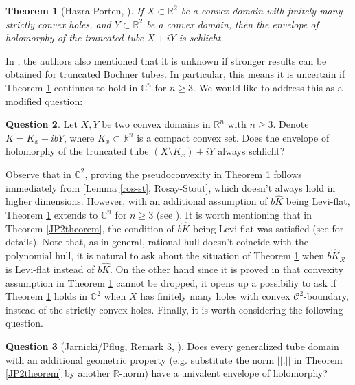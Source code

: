 \documentclass[12pt,reqno, a4paper]{amsart}
\newtheorem{theorem}{Theorem}[section]
\theoremstyle{definition}
\newtheorem{ques}[theorem]{Question}
\theoremstyle{definition}
\numberwithin{equation}{section}
\def\R{\mathbb{R}}                              %
\def\C{\mathbb{C}}                              %
\begin{document}
\begin{theorem}[Hazra-Porten, \cite{haz-por}]\label{haz-por_sch_2}
If $X\subset \R^2$ be a convex domain with finitely many strictly convex holes, and $Y \subset \R^2$ be a convex domain, then the envelope of holomorphy of the truncated tube $X+ iY$ is schlicht.
\end{theorem}

In \cite[Remark 4.2.(a)]{haz-por}, the authors also mentioned that it is unknown if stronger results can be obtained for truncated Bochner tubes. In particular, this means it is uncertain if Theorem \ref{haz-por_sch_2} continues to hold in $\C^n$ for $n\geq 3$. We would like to address this as a modified question:
\begin{ques}
Let $X,Y$ be two convex domains in $\R^n$ with $n\geq 3$. Denote $K=K_x+ibY$, where $K_x\subset \R^n$ is a compact convex set. Does the envelope of holomorphy of the truncated tube $(X\setminus K_x)+iY$ always schlicht? 
\end{ques}



Observe that in $\C^2$, proving  the  pseudoconvexity in Theorem \ref{haz-por_sch_2} follows immediately from [Lemma \ref{ros-st}, Rosay-Stout], which doesn't always hold in higher dimensions. However, with an additional assumption of $b\widehat{K}$ being Levi-flat,  Theorem \ref{haz-por_sch_2} extends to $\C^n$ for $n\geq 3$ (see \cite[Theorem 3.1]{thie}). It is worth mentioning that in Theorem \ref{JP2theorem}, the condition of $b\widehat{K}$ being Levi-flat was satisfied (see \cite[Remark 4.4.(a)]{haz-por} for details). Note that, as in general, rational hull doesn't coincide with the polynomial hull, it is natural to ask about the situation of Theorem \ref{haz-por_sch_2} when $b\widehat{K}_{\mathcal{R}}$ is Levi-flat instead of $b\widehat{K}$. On the other hand since it is proved in \cite[Example 4.3]{haz-por} that convexity assumption in Theorem \ref{haz-por_sch_2} cannot be dropped, it opens up a possibiliy to ask if Theorem \ref{haz-por_sch_2} holds in $\C^2$ when $X$ has finitely many holes with convex $\mathcal{C}^2$-boundary, instead of the strictly convex holes. Finally, it is worth considering the following question.

\begin{ques}[Jarnicki/Pflug, Remark 3, \cite{JP2}]\label{ques_3}
Does every generalized tube domain with an additional geometric property (e.g. substitute the norm $||.||$ in Theorem \ref{JP2theorem} by another $\R$-norm) have a univalent envelope of holomorphy? 
\end{ques}
\end{document}
